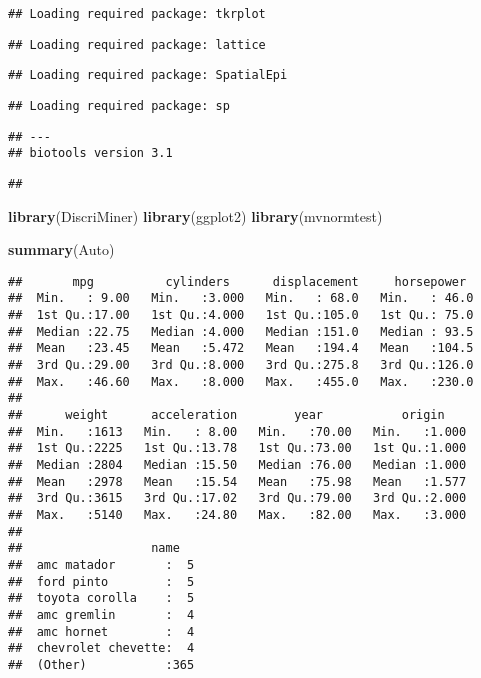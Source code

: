\documentclass[]{article}
\newenvironment{Shaded}{\begin{snugshade}}{\end{snugshade}}
\newcommand{\KeywordTok}[1]{\textcolor[rgb]{0.13,0.29,0.53}{\textbf{#1}}}
\newcommand{\NormalTok}[1]{#1}
\begin{document}
\begin{verbatim}
## Loading required package: tkrplot
\end{verbatim}

\begin{verbatim}
## Loading required package: lattice
\end{verbatim}

\begin{verbatim}
## Loading required package: SpatialEpi
\end{verbatim}

\begin{verbatim}
## Loading required package: sp
\end{verbatim}

\begin{verbatim}
## ---
## biotools version 3.1
\end{verbatim}

\begin{verbatim}
## 
\end{verbatim}

\begin{Shaded}
\begin{Highlighting}[]
\KeywordTok{library}\NormalTok{(DiscriMiner)}
\KeywordTok{library}\NormalTok{(ggplot2)}
\KeywordTok{library}\NormalTok{(mvnormtest)}
\end{Highlighting}
\end{Shaded}

\begin{Shaded}
\begin{Highlighting}[]
\KeywordTok{summary}\NormalTok{(Auto)}
\end{Highlighting}
\end{Shaded}

\begin{verbatim}
##       mpg          cylinders      displacement     horsepower   
##  Min.   : 9.00   Min.   :3.000   Min.   : 68.0   Min.   : 46.0  
##  1st Qu.:17.00   1st Qu.:4.000   1st Qu.:105.0   1st Qu.: 75.0  
##  Median :22.75   Median :4.000   Median :151.0   Median : 93.5  
##  Mean   :23.45   Mean   :5.472   Mean   :194.4   Mean   :104.5  
##  3rd Qu.:29.00   3rd Qu.:8.000   3rd Qu.:275.8   3rd Qu.:126.0  
##  Max.   :46.60   Max.   :8.000   Max.   :455.0   Max.   :230.0  
##                                                                 
##      weight      acceleration        year           origin     
##  Min.   :1613   Min.   : 8.00   Min.   :70.00   Min.   :1.000  
##  1st Qu.:2225   1st Qu.:13.78   1st Qu.:73.00   1st Qu.:1.000  
##  Median :2804   Median :15.50   Median :76.00   Median :1.000  
##  Mean   :2978   Mean   :15.54   Mean   :75.98   Mean   :1.577  
##  3rd Qu.:3615   3rd Qu.:17.02   3rd Qu.:79.00   3rd Qu.:2.000  
##  Max.   :5140   Max.   :24.80   Max.   :82.00   Max.   :3.000  
##                                                                
##                  name    
##  amc matador       :  5  
##  ford pinto        :  5  
##  toyota corolla    :  5  
##  amc gremlin       :  4  
##  amc hornet        :  4  
##  chevrolet chevette:  4  
##  (Other)           :365
\end{verbatim}
\end{document}
